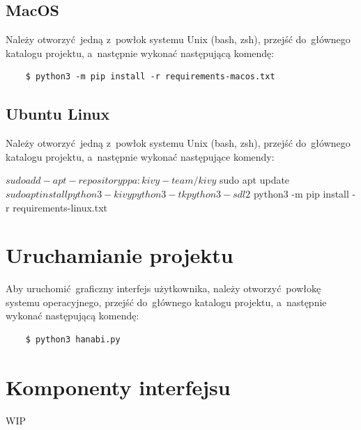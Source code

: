 \documentclass[declaration,shortabstract,inz]{iithesis}
\begin{document}
\subsection{MacOS}

Należy otworzyć jedną z~powłok systemu Unix (bash, zsh), przejść do~głównego katalogu projektu, a~następnie wykonać następującą komendę:
\begin{verbatim}
    $ python3 -m pip install -r requirements-macos.txt
\end{verbatim}

\subsection{Ubuntu Linux}

Należy otworzyć jedną z~powłok systemu Unix (bash, zsh), przejść do~głównego katalogu projektu, a~następnie wykonać następujące komendy:
\begin{spverbatim}
    $ sudo add-apt-repository ppa:kivy-team/kivy
    $ sudo apt update
    $ sudo apt install python3-kivy python3-tk python3-sdl2
    $ python3 -m pip install -r requirements-linux.txt
\end{spverbatim}

\section{Uruchamianie projektu}

Aby uruchomić graficzny interfejs użytkownika, należy otworzyć powłokę systemu operacyjnego, przejść do~głównego katalogu projektu, a~następnie wykonać następującą komendę:
\begin{verbatim}
    $ python3 hanabi.py
\end{verbatim}

\section{Komponenty interfejsu}

WIP
\end{document}
